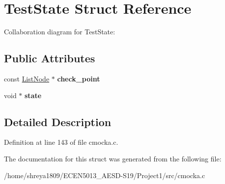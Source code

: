 \hypertarget{structTestState}{}\section{Test\+State Struct Reference}
\label{structTestState}


Collaboration diagram for Test\+State\+:
\subsection*{Public Attributes}
\begin{DoxyCompactItemize}
\item 
\mbox{\label{structTestState_a2c788f0404f8d97501b5cad7af459b5f}} 
const \hyperlink{structListNode}{List\+Node} $\ast$ {\bfseries check\+\_\+point}
\item 
\mbox{\label{structTestState_a7a40669131980ba9c632c6f9fa98f6a9}} 
void $\ast$ {\bfseries state}
\end{DoxyCompactItemize}


\subsection{Detailed Description}


Definition at line 143 of file cmocka.\+c.



The documentation for this struct was generated from the following file\+:\begin{DoxyCompactItemize}
\item 
/home/shreya1809/\+E\+C\+E\+N5013\+\_\+\+A\+E\+S\+D-\/\+S19/\+Project1/src/cmocka.\+c\end{DoxyCompactItemize}
